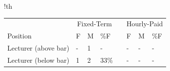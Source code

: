 \begin{tabbox}[11cm]{!th}

\caption{CSIT staff on fixed-term contracts and hourly-paid lecturing staff 
(2020)}
\label{tab:fthpstaff}
\footnotesize 

      
\begin{tabular}{p{4cm}
                C{1cm}
                C{1cm}
                C{1cm}
                p{0.7cm}
                C{1cm}
                C{1cm}
                C{1cm}}
\toprule 
  &  && \\
  Position & {F} & {M} & \%F && {F} & {M} & \%F\\
  \midrule 

  Lecturer (above bar)&- & 1 & - && - &- &-\\
  Lecturer (below bar)& 1&2 & 33\% && - &- &-\\
\bottomrule 
\end{tabular}

\end{tabbox}
